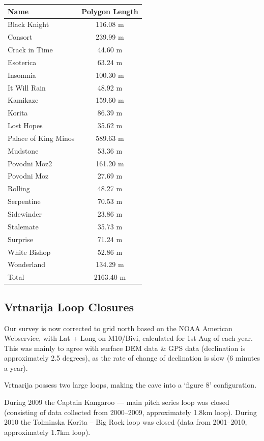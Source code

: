\begin{tabular}{l c}
Name & Polygon Length \\
\midrule
Black Knight & 116.08 m \\
Consort & 239.99 m \\
Crack in Time & 44.60 m \\
Esoterica & 63.24 m \\
Insomnia & 100.30 m \\
It Will Rain & 48.92 m \\
Kamikaze & 159.60 m \\
Korita & 86.39 m \\
Lost Hopes & 35.62 m \\
Palace of King Minos & 589.63 m \\
Mudstone & 53.36 m \\
Povodni Moz2 & 161.20 m \\
Povodni Moz & 27.69 m \\
Rolling & 48.27 m \\
Serpentine & 70.53 m \\
Sidewinder & 23.86 m \\
Stalemate & 35.73 m \\
Surprise & 71.24 m \\
White Bishop & 52.86 m \\
Wonderland & 134.29 m \\
\midrule
Total & 2163.40 m \\
\end{tabular}

\subsection{Vrtnarija Loop Closures}

Our survey is now corrected to grid north based on the NOAA American
Webservice, with Lat + Long on M10/Bivi, calculated for 1st Aug of each year.
This was mainly to agree with surface DEM data \& GPS data (declination is
approximately 2.5 degrees), as the rate of change of declination is slow (6
minutes a year).

Vrtnarija possess two large loops, making the cave into a `figure 8' configuration. 

During 2009 the Captain Kangaroo --- main pitch series loop was closed
(consisting of data collected from 2000--2009, approximately 1.8km loop).
During 2010 the Tolminska Korita -- Big Rock loop was closed (data from
2001--2010, approximately 1.7km loop).

